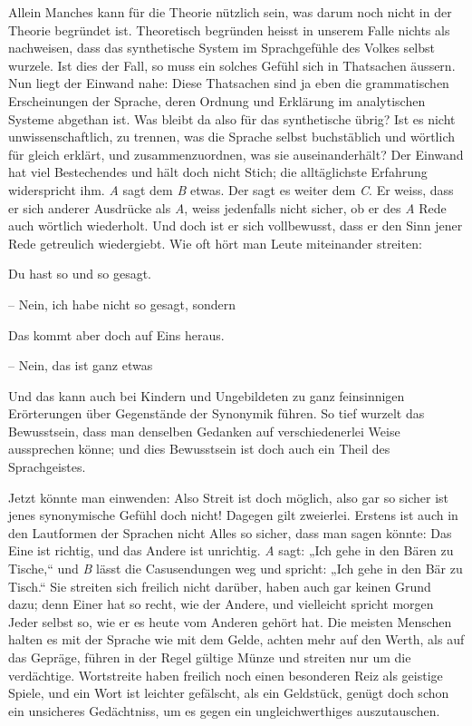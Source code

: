 Allein Manches kann für die Theorie nützlich sein, was darum noch nicht in der Theorie begründet ist. Theoretisch begründen heisst in unserem Falle nichts  als nachweisen, dass das synthetische System im Sprachgefühle des Volkes selbst wurzele. Ist dies der Fall, so muss ein solches Gefühl sich in Thatsachen äussern. Nun liegt der Einwand nahe: Diese Thatsachen sind ja eben die grammatischen Erscheinungen der Sprache, deren Ordnung und Erklärung im analytischen Systeme abgethan ist. Was bleibt da also für das synthetische übrig? Ist es nicht unwissenschaftlich, zu trennen, was die Sprache selbst buchstäblich und wörtlich für gleich erklärt, und zusammenzuordnen, was sie  auseinanderhält? Der Einwand hat viel Bestechendes und hält doch nicht Stich; die alltäglichste Erfahrung widerspricht ihm. \label{fp.101} \textit{A} sagt dem \textit{B} etwas. Der sagt es weiter dem \textit{C}. Er weiss, dass er sich anderer Ausdrücke  als \textit{A}, weiss jedenfalls nicht sicher, ob er des \textit{A} Rede auch wörtlich wiederholt. Und doch ist er sich vollbewusst, dass er den Sinn jener Rede getreulich wiedergiebt. Wie oft hört man Leute miteinander streiten:

Du hast so und so gesagt.

– Nein, ich habe nicht so gesagt, sondern 

Das kommt aber doch auf Eins heraus.

– Nein, das ist ganz etwas 

\noindent Und das kann auch bei Kindern und Ungebildeten zu ganz feinsinnigen Erörterungen über Gegenstände der Synonymik führen. So tief wurzelt das Bewusstsein, dass man denselben Gedanken auf verschiedenerlei Weise aussprechen könne; und dies Bewusstsein ist doch auch ein Theil des Sprachgeistes.

Jetzt könnte man einwenden: Also Streit ist doch möglich, also gar so sicher ist jenes synonymische Gefühl doch nicht! Dagegen gilt zweierlei. Erstens ist auch in den Lautformen der Sprachen nicht Alles so sicher, dass man sagen \label{sp.98} könnte: Das Eine ist richtig, und das Andere ist unrichtig. \textit{A} sagt: „Ich gehe in den Bären zu Tische,“ und \textit{B} lässt die Casusendungen weg und spricht: „Ich gehe in den Bär zu Tisch.“ Sie streiten sich freilich nicht darüber, haben auch gar keinen Grund dazu; denn Einer hat so recht, wie der Andere, und vielleicht spricht morgen Jeder selbst so, wie er es heute vom Anderen gehört hat. Die meisten Menschen halten es mit der Sprache wie mit dem Gelde, achten mehr auf den Werth, als auf das Gepräge, führen in der Regel gültige Münze und streiten nur um die verdächtige. Wortstreite haben freilich noch einen besonderen Reiz als geistige Spiele, und ein Wort ist leichter gefälscht, als ein Geldstück, genügt doch schon ein unsicheres Gedächtniss, um es gegen ein ungleichwerthiges auszutauschen.

